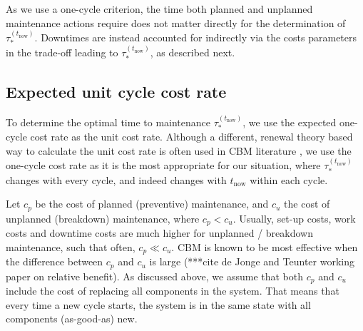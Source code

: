 \documentclass[authoryear]{elsarticle}
\def\tnow{t_\text{now}}
\newcommand{\Rsysnow}{R^{(t_\text{now})}_\text{sys}}
\newcommand{\tausnow}{\tau_*^{(\tnow)}}
\begin{document}
As we use a one-cycle criterion, the time both planned and unplanned maintenance actions require
does not matter directly for the determination of $\tausnow$.
Downtimes are instead accounted for indirectly via the costs parameters in the trade-off leading to $\tausnow$,
as described next.



\subsection{Expected unit cycle cost rate}
\label{sec:costrate}

To determine the optimal time to maintenance $\tausnow$,
we use the expected one-cycle cost rate 
\citep{1984:ansell-bendell-humble,1996:mazzuchi-soyer,2006:coolen-schrijner-coolen}
as the unit cost rate.
Although a different, renewal theory based way to calculate the unit cost rate is often used
in CBM literature \citep[e.g.,][]{2013:si-et-al,2011:kim-et-al},
we use the one-cycle cost rate as it is the most appropriate for our situation,
where $\tausnow$ changes with every cycle, and indeed changes with $\tnow$ within each cycle.

Let $c_p$ be the cost of planned (preventive) maintenance, and $c_u$ the cost of unplanned (breakdown) maintenance, where $c_p < c_u$.
Usually, set-up costs, work costs and downtime costs are much higher for unplanned / breakdown maintenance,
such that often, $c_p \ll c_u$.
CBM is known to be most effective when the difference between $c_p$ and $c_u$ is large
(***cite de Jonge and Teunter working paper on relative benefit).
%
As discussed above,
we assume that both $c_p$ and $c_u$ include the cost of replacing all components in the system.
That means that every time a new cycle starts, the system is in the same state with all components (as-good-as) new.
\end{document}
